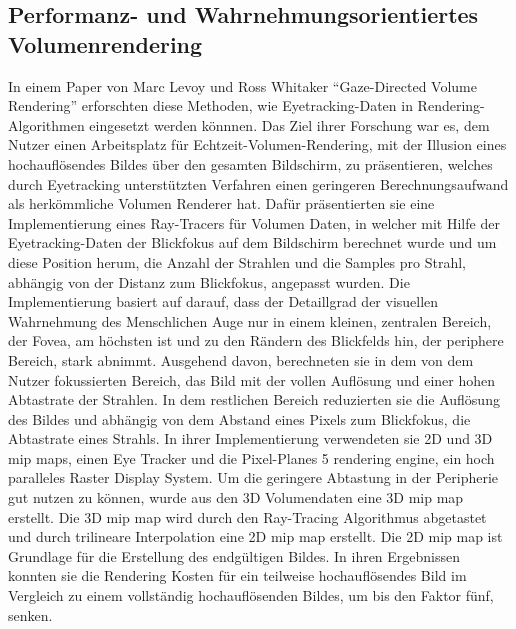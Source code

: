 \subsection{Performanz- und Wahrnehmungsorientiertes Volumenrendering}
In einem Paper von Marc Levoy und Ross Whitaker \enquote{Gaze-Directed Volume Rendering} \cite{Levoy:1990:GVR:91385.91449} erforschten diese Methoden, wie Eyetracking-Daten in Rendering-Algorithmen eingesetzt werden könnnen.
Das Ziel ihrer Forschung war es, dem Nutzer einen Arbeitsplatz für Echtzeit-Volumen-Rendering, mit der Illusion eines hochauflösendes Bildes über den gesamten Bildschirm, zu präsentieren, welches durch Eyetracking unterstützten Verfahren einen geringeren Berechnungsaufwand als herkömmliche Volumen Renderer hat.
Dafür präsentierten sie eine Implementierung eines Ray-Tracers für Volumen Daten, in welcher mit Hilfe der Eyetracking-Daten der Blickfokus auf dem Bildschirm berechnet wurde und um diese Position herum, die Anzahl der Strahlen und die Samples pro Strahl, abhängig von der Distanz zum Blickfokus, angepasst wurden.
Die Implementierung basiert auf darauf, dass der Detaillgrad der visuellen Wahrnehmung des Menschlichen Auge nur in einem kleinen, zentralen Bereich, der Fovea, am höchsten ist und zu den Rändern des Blickfelds hin, der periphere Bereich, stark abnimmt.
Ausgehend davon, berechneten sie in dem von dem Nutzer fokussierten Bereich, das Bild mit der vollen Auflösung und einer hohen Abtastrate der Strahlen.
In dem restlichen Bereich reduzierten sie die Auflösung des Bildes und abhängig von dem Abstand eines Pixels zum Blickfokus, die Abtastrate eines Strahls.
In ihrer Implementierung verwendeten sie 2D und 3D mip maps, einen Eye Tracker und die Pixel-Planes 5 rendering engine, ein hoch paralleles Raster Display System.
Um die geringere Abtastung in der Peripherie gut nutzen zu können, wurde aus den 3D Volumendaten eine 3D mip map erstellt.
Die 3D mip map wird durch den Ray-Tracing Algorithmus abgetastet und durch trilineare Interpolation eine 2D mip map erstellt.
Die 2D mip map ist Grundlage für die Erstellung des endgültigen Bildes.
In ihren Ergebnissen konnten sie die Rendering Kosten für ein teilweise hochauflösendes Bild im Vergleich zu einem vollständig hochauflösenden Bildes, um bis den Faktor fünf, senken.

